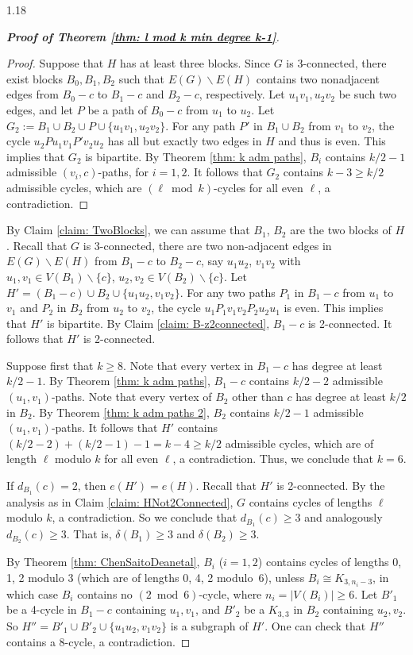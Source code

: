 \documentclass[10pt]{article}
\let\geq\geqslant
\begin{document}
\begin{spacing}{1.18}
\begin{proof}[\bf Proof of Theorem \ref{thm: l mod k min degree k-1}]
\begin{proof}
    Suppose that $H$ has at least three blocks. Since $G$ is 3-connected, there exist blocks $B_0,B_1,B_2$ such that $E(G)\backslash E(H)$ contains two nonadjacent edges from $B_0-c$ to $B_1-c$ and $B_2-c$, respectively. Let $u_1v_1, u_2v_2$ be such two edges, and let $P$ be a path of $B_0-c$ from $u_1$ to $u_2$. 
    Let $G_2:=B_1\cup B_2\cup P\cup \{u_1v_1, u_2v_2\}$. For any path $P'$ in $B_1\cup B_2$ from $v_1$ to $v_2$, the cycle $u_2Pu_1v_1P'v_2u_2$ has all but exactly two edges in $H$ and thus is even. This implies that $G_2$ is bipartite. By Theorem \ref{thm: k adm paths}, $B_i$ contains $k/2-1$ admissible $(v_i,c)$-paths, for $i=1,2$. It follows that $G_2$ contains $k-3\geqslant k/2$ admissible cycles, which are $(\ell\bmod k)$-cycles for all even $\ell$, a contradiction.
\end{proof}

By Claim \ref{claim: TwoBlocks}, we can assume that $B_1$, $B_2$ are the two blocks of $H$. Recall that $G$ is 3-connected, there are two non-adjacent edges in $E(G)\backslash E(H)$ from $B_1-c$ to $B_2-c$, say $u_1u_2$, $v_1v_2$ with $u_1,v_1\in V(B_1)\backslash\{c\}$, $u_2,v_2\in V(B_2)\backslash\{c\}$. Let $H'=(B_1-c)\cup B_2\cup \{u_1u_2,v_1v_2\}$. For any two paths $P_1$ in $B_1-c$ from $u_1$ to $v_1$ and $P_2$ in $B_2$ from $u_2$ to $v_2$, the cycle $u_1P_1v_1v_2P_2u_2u_1$ is even. This implies that $H'$ is bipartite. By Claim \ref{claim: B-z2connected}, $B_1-c$ is 2-connected. It follows that $H'$ is 2-connected.

Suppose first that $k\geqslant 8$. Note that every vertex in $B_1-c$ has degree at least $k/2-1$. By Theorem \ref{thm: k adm paths}, $B_1-c$ contains $k/2-2$ admissible $(u_1,v_1)$-paths. Note that every vertex of $B_2$ other than $c$ has degree at least $k/2$ in $B_2$. By Theorem \ref{thm: k adm paths 2}, $B_2$ contains $k/2-1$ admissible $(u_1,v_1)$-paths. It follows that $H'$ contains $(k/2-2)+(k/2-1)-1=k-4\geqslant k/2$ admissible cycles, which are of length $\ell$ modulo $k$ for all even $\ell$, a contradiction. Thus, we conclude that $k=6$.

If $d_{B_1}(c)=2$, then $e(H')=e(H)$. Recall that $H'$ is 2-connected. By the analysis as in Claim \ref{claim: HNot2Connected}, $G$ contains cycles of lengths $\ell$ modulo $k$, a contradiction. So we conclude that $d_{B_1}(c)\geqslant 3$ and analogously $d_{B_2}(c)\geqslant 3$. That is, $\delta(B_1)\geqslant 3$ and $\delta(B_2)\geqslant 3$. 

By Theorem \ref{thm: ChenSaitoDeanetal}, $B_i$ ($i=1,2$) contains cycles of lengths 0, 1, 2 modulo 3 (which are of lengths 0, 4, 2 modulo~6), unless $B_i\cong K_{3,n_i-3}$, in which case $B_i$ contains no $(2\bmod 6)$-cycle, where $n_i=|V(B_i)|\geq 6$. Let $B'_1$ be a 4-cycle in $B_1-c$ containing $u_1,v_1$, and $B'_2$ be a $K_{3,3}$ in $B_2$ containing $u_2,v_2$. So $H''=B'_1\cup B'_2\cup\{u_1u_2,v_1v_2\}$ is a subgraph of $H'$. One can check that $H''$ contains a 8-cycle, a contradiction.
\end{proof}






\end{spacing}
\end{document}
